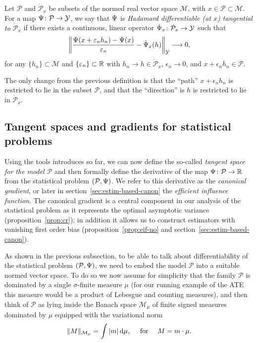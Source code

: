 \documentclass[a4,danish]{article}
\begin{document}
\begin{definition}
  Let $\mathcal{P}$ and $\dot{\mathcal{P}}_x$ be subsets of the normed real vector space
  $\mathcal{M}$, with $x \in \mathcal{P} \subset \mathcal{M}$. For a map
  $\operatorname{\Psi} \colon \mathcal{P} \rightarrow \mathcal{Y}$, we say that $\operatorname{\Psi}$ is \textit{Hadamard
    differentiable (at $x$) tangential to $\dot{\mathcal{P}}_x$} if there exists a continuous,
  linear operator $\dot{\operatorname{\Psi}}_x \colon \dot{\mathcal{P}}_x \rightarrow \mathcal{Y}$ such that
  \begin{equation*}
    \left\Vert
      \frac{\operatorname{\Psi}(x + \varepsilon_n h_n) - \operatorname{\Psi}(x)}{\varepsilon_n} - \dot{\operatorname{\Psi}}_x(h)
    \right\Vert_{\mathcal{Y}} \longrightarrow 0, 
  \end{equation*}
  for any $\{h_n\} \subset \mathcal{M}$ and $\{\varepsilon_n\} \subset \mathbb{R}$ with
  $h_n \rightarrow h \in \dot{\mathcal{P}}_x$, $\epsilon_n\rightarrow 0$, and
  $x + \epsilon_n h_n \in \mathcal{P}$.
\end{definition}

The only change from the previous definition is that the ``path'' $x + \epsilon_n h_n$ is restricted
to lie in the subset $\mathcal{P}$, and that the ``direction'' is $h$ is restricted to lie in
$\dot{\mathcal{P}}_x$.

\subsection{Tangent spaces and gradients for statistical problems}
\label{sec:tang-spac-grad}

Using the tools introduces so far, we can now define the so-called \textit{tangent space for the
  model $\mathcal{P}$} and then formally define the derivative of the map
$\operatorname{\Psi}\colon\mathcal{P} \rightarrow \mathbb{R}$ from the statistical problem $(\mathcal{P}, \operatorname{\Psi})$. We refer to
this derivative as the \textit{canonical gradient}, or later in section~\ref{sec:estim-based-canon}
the \textit{efficient influence function}. The canonical gradient is a central component in our
analysis of the statistical problem as it represents the optimal asymptotic variance
(proposition~\ref{prop:cr}); in addition it allows us to construct estimators with vanishing first
order bias (proposition~\ref{prop:eif-no} and section~\ref{sec:estim-based-canon}).

As shown in the previous subsection, to be able to talk about differentiability of the statistical
problem $(\mathcal{P}, \operatorname{\Psi})$, we need to embed the model $\mathcal{P}$ into a suitable normed vector
space. To do so we now assume for simplicity that the family $\mathcal{P}$ is dominated by a single
$\sigma$-finite measure $\mu$ (for our running example of the ATE this measure would be a product of
Lebesgue and counting measures), and then think of $\mathcal{P}$ as lying inside the Banach space
$\mathcal{M}_{\mu}$ of finite signed measures dominated by $\mu$ equipped with the variational norm
\begin{equation*}
  \Vert M \Vert_{\mathcal{M}_{\mu}} = \int |m |\mathop{}\!\mathrm{d} \mu, \quad \text{ for } \quad M = m \cdot \mu.
\end{equation*}
\end{document}
